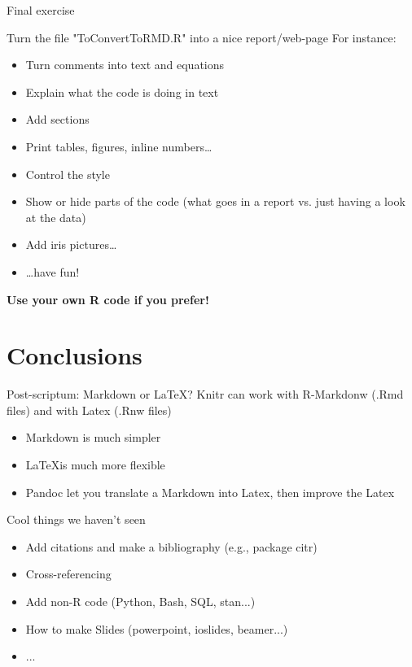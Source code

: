 \documentclass[10pt]{beamer}\usepackage[]{graphicx}\usepackage[]{color}
\begin{document}

\begin{frame}{Final exercise}

Turn the file "ToConvertToRMD.R" into a nice report/web-page
For instance:
\begin{itemize}
  \item Turn comments into text and equations
  \item Explain what the code is doing in text
  \item Add sections
  \item Print tables, figures, inline numbers\dots
  \item Control the style
  \item Show or hide parts of the code (what goes in a report vs. just having a look at the data)
  \item Add iris pictures\dots
  \item \dots have fun!
\end{itemize}

\textbf{Use your own R code if you prefer!}

\end{frame}


\section{Conclusions}


\begin{frame}{Post-scriptum: Markdown or \LaTeX?}
Knitr can work with R-Markdonw (.Rmd files) and with Latex (.Rnw files)
\begin{itemize}
  \item Markdown is much simpler
  \item \LaTeX is much more flexible
  \item Pandoc let you translate a Markdown into Latex, then improve the Latex
\end{itemize}
\end{frame}

\begin{frame}{Cool things we haven't seen}
\begin{itemize}
  \item Add citations and make a bibliography (e.g., package citr)
  \item Cross-referencing
  \item Add non-R code (Python, Bash, SQL, stan...)
  \item How to make Slides (powerpoint, ioslides, beamer...)
  \item ...
\end{itemize}
\end{frame}
\end{document}
